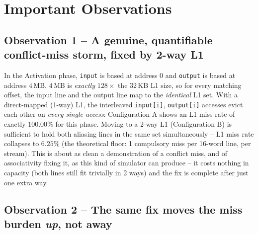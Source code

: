\documentclass[11pt]{article}
\begin{document}
\section{Important Observations}
\label{sec:analysis}

\subsection{Observation 1 -- A genuine, quantifiable conflict-miss storm, fixed by 2-way L1}

In the Activation phase, \texttt{input} is based at address 0 and
\texttt{output} is based at address $4\,\text{MB}$. $4\,\text{MB}$ is
\emph{exactly} $128\times$ the 32\,KB L1 size, so for every matching
offset, the input line and the output line map to the \emph{identical}
L1 set. With a direct-mapped (1-way) L1, the interleaved
\texttt{input[i]}, \texttt{output[i]} accesses evict each other on
\emph{every single access}: Configuration A shows an L1 miss rate of
exactly $100.00\%$ for this phase. Moving to a 2-way L1 (Configuration B)
is sufficient to hold both aliasing lines in the same set simultaneously
-- L1 miss rate collapses to $6.25\%$ (the theoretical floor: 1 compulsory
miss per 16-word line, per stream). This is about as clean a
demonstration of a conflict miss, and of associativity fixing it, as this
kind of simulator can produce -- it costs nothing in capacity (both lines
still fit trivially in 2 ways) and the fix is complete after just one
extra way.

\subsection{Observation 2 -- The same fix moves the miss burden \emph{up}, not away}
\end{document}
